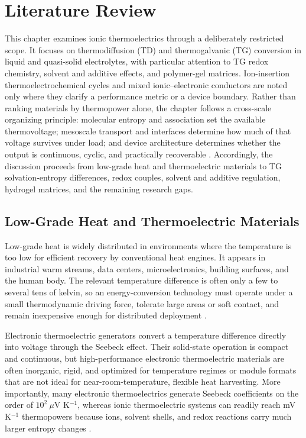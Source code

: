 \chapter{Literature Review}

This chapter examines ionic thermoelectrics through a deliberately restricted
scope. It focuses on thermodiffusion (TD) and thermogalvanic (TG) conversion in
liquid and quasi-solid electrolytes, with particular attention to TG redox
chemistry, solvent and additive effects, and polymer-gel matrices. Ion-insertion
thermoelectrochemical cycles and mixed ionic--electronic conductors are noted
only where they clarify a performance metric or a device boundary. Rather than
ranking materials by thermopower alone, the chapter follows a cross-scale
organizing principle: molecular entropy and association set the available
thermovoltage; mesoscale transport and interfaces determine how much of that
voltage survives under load; and device architecture determines whether the
output is continuous, cyclic, and practically recoverable
\citep{jabeen2024recent,kim2026functional,shang2026pushing,xu2026birdseye}.
Accordingly, the discussion proceeds from low-grade heat and thermoelectric
materials to TG solvation-entropy differences, redox couples, solvent and
additive regulation, hydrogel matrices, and the remaining research gaps.

\section{Low-Grade Heat and Thermoelectric Materials}

Low-grade heat is widely distributed in environments where the temperature is
too low for efficient recovery by conventional heat engines. It appears in
industrial warm streams, data centers, microelectronics, building surfaces, and
the human body. The relevant temperature difference is often only a few to
several tens of kelvin, so an energy-conversion technology must operate under a
small thermodynamic driving force, tolerate large areas or soft contact, and
remain inexpensive enough for distributed deployment \citep{duan2021liquid,
liu2021wearable,shang2026pushing}.

Electronic thermoelectric generators convert a temperature difference directly
into voltage through the Seebeck effect. Their solid-state operation is compact
and continuous, but high-performance electronic thermoelectric materials are
often inorganic, rigid, and optimized for temperature regimes or module formats
that are not ideal for near-room-temperature, flexible heat harvesting. More
importantly, many electronic thermoelectrics generate Seebeck
coefficients on the order of $10^2\ \mu$V K$^{-1}$, whereas ionic
thermoelectric systems can readily reach mV K$^{-1}$ thermopowers because
ions, solvent shells, and redox reactions carry much larger entropy changes
\citep{duan2021liquid,jabeen2024recent,kim2026functional}.

